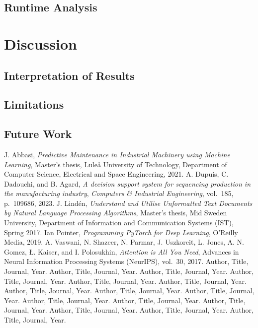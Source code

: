 \documentclass[12pt,a4paper]{report}
\begin{document}
\section{Runtime Analysis}

\chapter{Discussion}
\section{Interpretation of Results}
\section{Limitations}
\section{Future Work}


\begin{thebibliography}{99}
J. Abbasi, \textit{Predictive Maintenance in Industrial Machinery using Machine Learning}, 
Master’s thesis, Luleå University of Technology, Department of Computer Science, Electrical and Space Engineering, 2021.
A. Dupuis, C. Dadouchi, and B. Agard, 
        \textit{A decision support system for sequencing production in the manufacturing industry},
\textit{Computers \& Industrial Engineering}, vol.~185, p.~109686, 2023. 
 J. Lindén, 
    \textit{Understand and Utilise Unformatted Text Documents by Natural Language Processing Algorithms}, 
    Master’s thesis, Mid Sweden University, Department of Information and Communication Systems (IST), Spring 2017.
 Ian Pointer,
\textit{Programming PyTorch for Deep Learning},
O'Reilly Media, 2019.
A. Vaswani, N. Shazeer, N. Parmar, J. Uszkoreit, L. Jones, 
A. N. Gomez, Ł. Kaiser, and I. Polosukhin, 
\textit{Attention is All You Need}, Advances in Neural Information Processing Systems (NeurIPS), vol.~30, 2017.
 Author, Title, Journal, Year.
 Author, Title, Journal, Year.
 Author, Title, Journal, Year.
 Author, Title, Journal, Year.
 Author, Title, Journal, Year.
 Author, Title, Journal, Year.
 Author, Title, Journal, Year.
 Author, Title, Journal, Year.
 Author, Title, Journal, Year.
 Author, Title, Journal, Year.
 Author, Title, Journal, Year.
 Author, Title, Journal, Year.
 Author, Title, Journal, Year.
 Author, Title, Journal, Year.
 Author, Title, Journal, Year.
\end{thebibliography}
\end{document}
